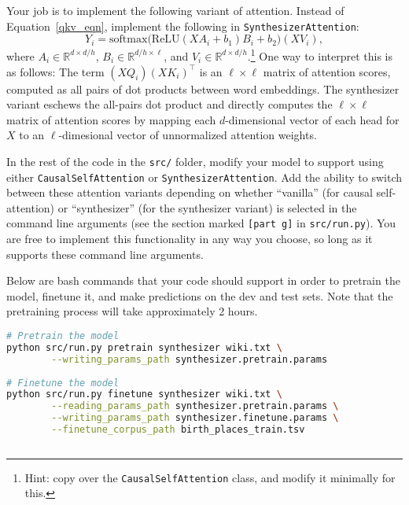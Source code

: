 \begin{enumerate}[(a)]
Your job is to implement the following variant of attention. Instead of Equation~\ref{qkv_eqn}, implement the following in \texttt{SynthesizerAttention}:
\begin{equation} 
Y_i = \text{softmax}\big(\text{ReLU}(XA_i+b_1)B_i + b_2 \big)(XV_i),
\end{equation}
where $A_i\in\mathbb{R}^{d \times d/h}$, $B_i\in\mathbb{R}^{d/h\times \ell}$, and $V_i\in\mathbb{R}^{d\times d/h}$.\footnote{Hint: copy over the \texttt{CausalSelfAttention} class, and modify it minimally for this.}
One way to interpret this is as follows: The term $(XQ_i)(XK_i)^\top$ is an $\ell \times \ell$ matrix of attention scores, computed as all pairs of dot products between word embeddings.
The synthesizer variant eschews the all-pairs dot product and directly computes the $\ell \times \ell$ matrix of attention scores by mapping each $d$-dimensional vector of each head for $X$ to an $\ell$-dimesional vector of unnormalized attention weights.

In the rest of the code in the \texttt{src/} folder, modify your model to support using either \texttt{CausalSelfAttention} or \texttt{SynthesizerAttention}. Add the ability to switch between these attention variants depending on whether ``vanilla'' (for causal self-attention) or ``synthesizer'' (for the synthesizer variant) is selected in the command line arguments (see the section marked \texttt{[part g]} in \texttt{src/run.py}). 
You are free to implement this functionality in any way you choose, so long as it supports these command line arguments.

Below are bash commands that your code should support in order to pretrain the model, finetune it, and make predictions on the dev and test sets.
Note that the pretraining process will take approximately 2 hours.
\begin{lstlisting}[language=bash]
# Pretrain the model
python src/run.py pretrain synthesizer wiki.txt \
        --writing_params_path synthesizer.pretrain.params
        
# Finetune the model
python src/run.py finetune synthesizer wiki.txt \
        --reading_params_path synthesizer.pretrain.params \
        --writing_params_path synthesizer.finetune.params \
        --finetune_corpus_path birth_places_train.tsv
        

\end{lstlisting}
\end{enumerate}
